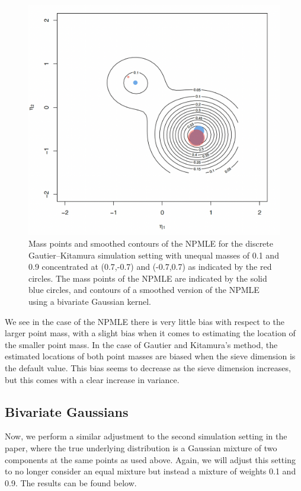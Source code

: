 \documentclass[11pt]{article}
\begin{document}
\begin{figure}[H]
\centering
\includegraphics[scale = 0.5]{KW0_new.png}
\caption{Mass points and smoothed contours of the NPMLE for the discrete Gautier–Kitamura simulation setting with unequal masses of 0.1 and 0.9 concentrated at (0.7,-0.7) and (-0.7,0.7) as indicated by the red circles. The mass points of the NPMLE are indicated by the solid blue circles, and contours of a smoothed version of the NPMLE using a bivariate Gaussian kernel.}
\end{figure}



We see in the case of the NPMLE there is very little bias with respect to the larger point mass, with a slight bias when it comes to estimating the location of the smaller point mass. In the case of Gautier and Kitamura's method, the estimated locations of both point masses are biased when the sieve dimension is the default value. This bias seems to decrease as the sieve dimension increases, but this comes with a clear increase in variance.  

\subsection{Bivariate Gaussians}

\indent

Now, we perform a similar adjustment to the second simulation setting in the paper, where the true underlying distribution is a Gaussian mixture of two components at the same points as used above. Again, we will adjust this setting to no longer consider an equal mixture but instead a mixture of weights 0.1 and 0.9. The results can be found below. 
\end{document}
